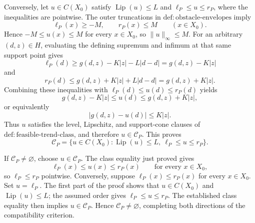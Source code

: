 Conversely, let \(u\in C(X_0)\) satisfy \(\operatorname{Lip}(u)\le L\) and \(\ell_P\le u\le r_P\), where the inequalities are pointwise.  The outer truncations in \(\mathrm{def:obstacle\mbox{-}envelopes}\) imply
\[
\ell_P(x)\ge -M,
\qquad
r_P(x)\le M
\qquad (x\in X_0).
\]
Hence \(-M\le u(x)\le M\) for every \(x\in X_0\), so \(\|u\|_\infty\le M\).  For an arbitrary \((d,z)\in H\), evaluating the defining supremum and infimum at that same support point gives
\[
\ell_P(d)
\ge g(d,z)-K|z|-L|d-d|
=g(d,z)-K|z|
\]
and
\[
r_P(d)
\le g(d,z)+K|z|+L|d-d|
=g(d,z)+K|z|.
\]
Combining these inequalities with \(\ell_P(d)\le u(d)\le r_P(d)\) yields
\[
g(d,z)-K|z|\le u(d)\le g(d,z)+K|z|,
\]
or equivalently
\[
|g(d,z)-u(d)|\le K|z|.
\]
Thus \(u\) satisfies the level, Lipschitz, and support-cone clauses of \(\mathrm{def:feasible\mbox{-}trend\mbox{-}class}\), and therefore \(u\in\mathcal C_P\).  This proves
\[
\mathcal C_P
=
\{u\in C(X_0):\operatorname{Lip}(u)\le L,\ \ell_P\le u\le r_P\}.
\]

If \(\mathcal C_P\ne\varnothing\), choose \(u\in\mathcal C_P\).  The class equality just proved gives
\[
\ell_P(x)\le u(x)\le r_P(x)
\qquad\text{for every }x\in X_0,
\]
so \(\ell_P\le r_P\) pointwise.  Conversely, suppose \(\ell_P(x)\le r_P(x)\) for every \(x\in X_0\).  Set \(u=\ell_P\).  The first part of the proof shows that \(u\in C(X_0)\) and \(\operatorname{Lip}(u)\le L\); the assumed order gives \(\ell_P\le u\le r_P\).  The established class equality then implies \(u\in\mathcal C_P\).  Hence \(\mathcal C_P\ne\varnothing\), completing both directions of the compatibility criterion.
